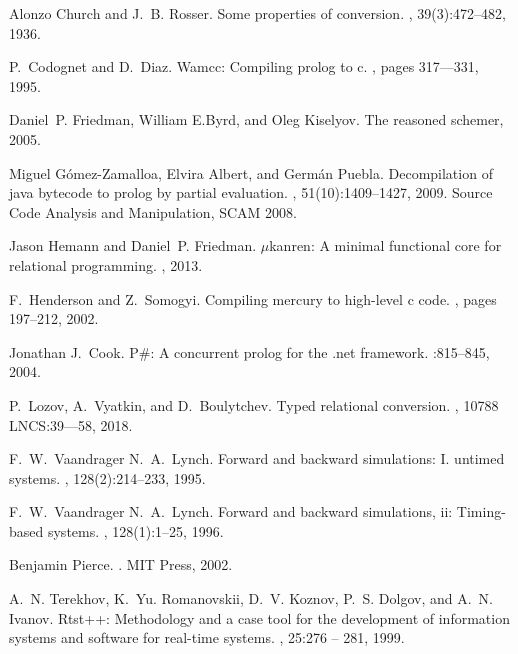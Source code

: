 \begin{thebibliography}{10}
Alonzo Church and J.~B. Rosser.
\newblock Some properties of conversion.
,
  39(3):472--482, 1936.

P.~Codognet and D.~Diaz.
\newblock Wamcc: Compiling prolog to c.
, pages 317--–331, 1995.

Daniel~P. Friedman, William E.Byrd, and Oleg Kiselyov.
\newblock The reasoned schemer, 2005.

Miguel Gómez-Zamalloa, Elvira Albert, and Germán Puebla.
\newblock Decompilation of java bytecode to prolog by partial evaluation.
, 51(10):1409--1427, 2009.
\newblock Source Code Analysis and Manipulation, SCAM 2008.

Jason Hemann and Daniel~P. Friedman.
\newblock $\mu$kanren: A minimal functional core for relational programming.
, 2013.

F.~Henderson and Z.~Somogyi.
\newblock Compiling mercury to high-level c code.
, pages 197--212, 2002.

Jonathan J.~Cook.
\newblock P\#: A concurrent prolog for the .net framework.
:815--845, 2004.

P.~Lozov, A.~Vyatkin, and D.~Boulytchev.
\newblock Typed relational conversion.
, 10788 LNCS:39---58, 2018.

F.~W.~Vaandrager N.~A.~Lynch.
\newblock Forward and backward simulations: I. untimed systems.
, 128(2):214--233, 1995.

F.~W.~Vaandrager N.~A.~Lynch.
\newblock Forward and backward simulations, ii: Timing-based systems.
, 128(1):1--25, 1996.

Benjamin Pierce.
.
\newblock MIT Press, 2002.

A.~N. Terekhov, K.~Yu. Romanovskii, D.~V. Koznov, P.~S. Dolgov, and A.~N.
  Ivanov.
\newblock Rtst++: Methodology and a case tool for the development of
  information systems and software for real-time systems.
, 25:276 -- 281, 1999.


\end{thebibliography}
